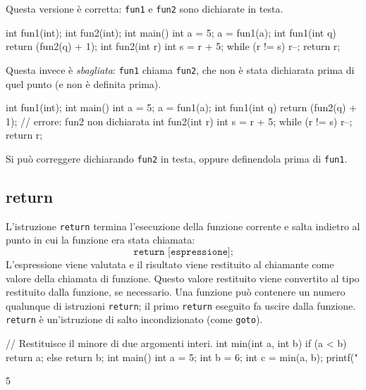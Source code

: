 \documentclass[11pt,a4paper]{article}
\begin{document}
\begin{esempio}
Questa versione è corretta: \lstinline|fun1| e \lstinline|fun2| sono dichiarate in testa.
\begin{codice}
int fun1(int);
int fun2(int);
int main() {
    int a = 5;
    a = fun1(a);
}
int fun1(int q) {
    return (fun2(q) + 1);
}
int fun2(int r) {
    int s = r + 5;
    while (r != s)
        r--;
    return r;
}
\end{codice}
Questa invece è \emph{sbagliata}: \lstinline|fun1| chiama \lstinline|fun2|, che non è stata dichiarata prima di quel punto (e non è definita prima).
\begin{codice}
int fun1(int);
int main() {
    int a = 5;
    a = fun1(a);
}
int fun1(int q) {
    return (fun2(q) + 1);   // errore: fun2 non dichiarata
}
int fun2(int r) {
    int s = r + 5;
    while (r != s)
        r--;
    return r;
}
\end{codice}
Si può correggere dichiarando \lstinline|fun2| in testa, oppure definendola prima di \lstinline|fun1|.
\end{esempio}

\subsection{return}

L'istruzione \lstinline|return| termina l'esecuzione della funzione corrente e salta indietro al punto in cui la funzione era stata chiamata:
\[
\texttt{return [espressione];}
\]
L'espressione viene valutata e il risultato viene restituito al chiamante come valore della chiamata di funzione. Questo valore restituito viene convertito al tipo restituito dalla funzione, se necessario. Una funzione può contenere un numero qualunque di istruzioni \lstinline|return|; il primo \lstinline|return| eseguito fa uscire dalla funzione. \lstinline|return| è un'istruzione di salto incondizionato (come \lstinline|goto|).

\begin{esempio}
\begin{codice}
// Restituisce il minore di due argomenti interi.
int min(int a, int b)
{
    if (a < b)
        return a;
    else
        return b;
}
int main()
{
    int a = 5;
    int b = 6;
    int c = min(a, b);
    printf("%
}
\end{codice}
\begin{risultato}
5
\end{risultato}
\end{esempio}
\end{document}
